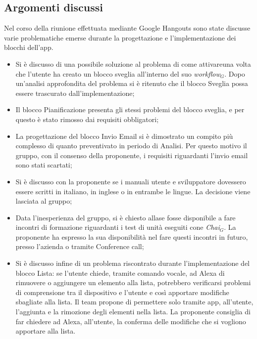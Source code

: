 \documentclass[a4paper,12pt]{article}
\begin{document}
	\subsection{Argomenti discussi}
	Nel corso della riunione effettuata mediante Google Hangouts sono state discusse varie problematiche emerse durante la progettazione e l'implementazione dei blocchi dell'app.
	\begin{itemize}
		\item {Si è discusso di una possibile soluzione al problema di come attivareuna volta che l'utente ha creato un blocco sveglia all'interno del suo \textit{workflow$_{G}$}. Dopo un'analisi approfondita del problema si è ritenuto che il blocco Sveglia possa essere trascurato dall'implementazione;}
		\item {Il blocco Pianificazione presenta gli stessi problemi del blocco sveglia, e per questo è stato rimosso dai requisiti obbligatori};
		\item {La progettazione del blocco Invio Email si è dimostrato un compito più complesso di quanto preventivato in periodo di Analisi. Per questo motivo il gruppo, con il consenso della proponente, i requisiti riguardanti l'invio email sono stati scartati};
		\item {Si è discusso con la proponente se i manuali utente e sviluppatore dovessero essere scritti in italiano, in inglese o in entrambe le lingue. La decisione viene lasciata al gruppo;}
		\item {Data l'inesperienza del gruppo, si è chiesto allase fosse disponibile a fare incontri di formazione riguardanti i test di unità eseguiti cone \textit{Chai$_{G}$}. La proponente ha espresso la sua disponibilità nel fare questi incontri in futuro, presso l'azienda o tramite Conference call;}
		\item {Si è discusso infine di un problema riscontrato durante l'implementazione del blocco Lista: se l'utente chiede, tramite comando vocale, ad Alexa di rimuovere o aggiungere un elemento alla lista, potrebbero verificarsi problemi di comprensione tra il dispositivo e l'utente e così apportare modifiche sbagliate alla lista. Il team propone di permettere solo tramite app, all'utente, l'aggiunta e la rimozione degli elementi nella lista. La proponente consiglia di far chiedere ad Alexa, all'utente, la conferma delle modifiche che si vogliono apportare alla lista.}
	\end{itemize}
\end{document}
